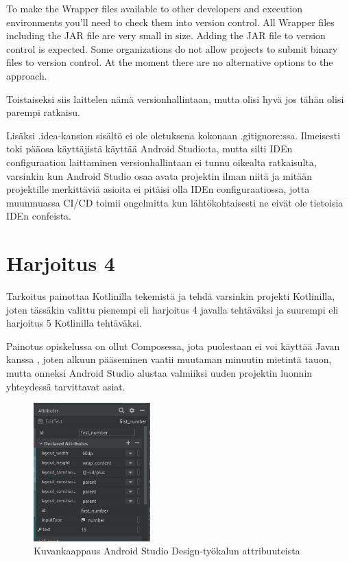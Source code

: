\begin{displayquote}
To make the Wrapper files available to other developers and execution
environments you’ll need to check them into version control. All Wrapper files
including the JAR file are very small in size. Adding the JAR file to version
control is expected. Some organizations do not allow projects to submit binary
files to version control. At the moment there are no alternative options to the
approach.
\end{displayquote}

Toistaiseksi siis laittelen nämä versionhallintaan, mutta olisi hyvä jos tähän
olisi parempi ratkaisu.

Lisäksi .idea-kansion sisältö ei ole oletuksena kokonaan .gitignore:ssa.
Ilmeisesti toki pääosa käyttäjistä käyttää Android Studio:ta, mutta silti IDEn
configuraation laittaminen versionhallintaan ei tunnu oikealta ratkaisulta,
varsinkin kun Android Studio osaa avata projektin ilman niitä ja mitään
projektille merkittäviä asioita ei pitäisi olla IDEn configuraatiossa, jotta
muunmuassa CI/CD toimii ongelmitta kun lähtökohtaisesti ne eivät ole tietoisia
IDEn confeista.

\section{Harjoitus 4}

Tarkoitus painottaa Kotlinilla tekemistä ja tehdä varsinkin projekti
Kotlinilla, joten tässäkin valittu pienempi eli harjoitus 4 javalla tehtäväksi
ja suurempi eli harjoitus 5 Kotlinilla tehtäväksi.

Painotus opiskelussa on ollut Composessa, jota puolestaan ei voi käyttää Javan
kanssa \parencite{StackoverflowComposeInJava}, joten alkuun pääseminen vaatii
muutaman minuutin mietintä tauon, mutta onneksi Android Studio alustaa
valmiiksi uuden projektin luonnin yhteydessä tarvittavat asiat.

\begin{figure}
    \includegraphics[width=0.4\textwidth]{figures/exercise-4-attributes.png}
    \caption{Kuvankaappaus Android Studio Design-työkalun attribuuteista}
    \label{fig:exercise-4-attributes}
\end{figure}

